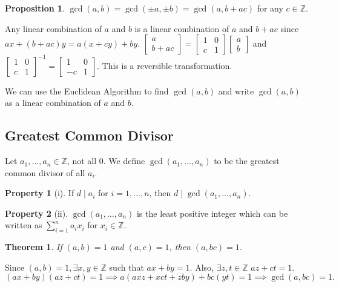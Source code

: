 \documentclass[11pt]{article}
\newtheorem{thm}{Theorem}[section]
\theoremstyle{definition}
\newtheorem{prop}{Proposition}[section]
\newtheorem{pty}{Property}[section]
\newcommand{\The}[2]{\begin{#1}#2\end{#1}}
\newcommand{\rng}[2]{#1,\dots,#2}
\newcommand{\srng}[3]{#1_#2,\dots,#1_#3}
\newcommand{\st}[0]{\text{ such that }}
\newcommand{\ZZ}{\mathbb{Z}}
\begin{document}
\begin{prop} $\gcd(a,b) = \gcd(\pm a, \pm b) = \gcd(a, b+ac)$ for any $c\in\ZZ$. \end{prop}
\proof Any linear combination of $a$ and $b$ is a linear combination of $a$ and $b+ac$ since $ax+(b+ac)y = a(x+cy)+by$. 
\proof $\begin{bmatrix} a \\ b+ac \end{bmatrix} = \begin{bmatrix} 1 & 0 \\ c & 1 \end{bmatrix}\begin{bmatrix} a \\ b \end{bmatrix}$ and $\begin{bmatrix} 1&0\\c&1 \end{bmatrix}^{-1} = \begin{bmatrix} 1&0\\-c&1\end{bmatrix}$. This is a reversible transformation. 
\qedhere

\The{cor}{
	We can use the Euclidean Algorithm to find $\gcd(a,b)$ and write $\gcd(a,b)$ as a linear combination of $a$ and $b$.
}


\subsection{Greatest Common Divisor}
\The{defn}{
	Let $a_1,\dots,a_n \in \ZZ$, not all $0$. We define $\gcd(a_1,\dots,a_n)$ to be the greatest common divisor of all $a_i$. 
}

\begin{pty}[i]
If $d\mid a_i$ for $i=\rng{1}{n}$, then $d\mid \gcd(\srng{a}{1}{n})$. 
\end{pty}
\begin{pty}[ii] $\gcd(\srng{a}{1}{n})$ is the least positive integer which can be written as $\sum_{i=1}^{n}{a_ix_i}$ for $x_i\in\ZZ$.
\end{pty}

\begin{thm}
If $(a,b)=1$ and $(a,c)=1$, then $(a,bc)=1$.
\end{thm}
\proof Since $(a,b)=1, \exists x,y\in\ZZ$ such that $ax+by=1$.
Also, $\exists z,t\in\ZZ$ \st $az+ct=1$.
$$(ax+by)(az+ct)=1 \implies a(axz+xct+zby)+bc(yt) = 1 \implies \gcd(a,bc)=1.$$
\qedhere
\end{document}
